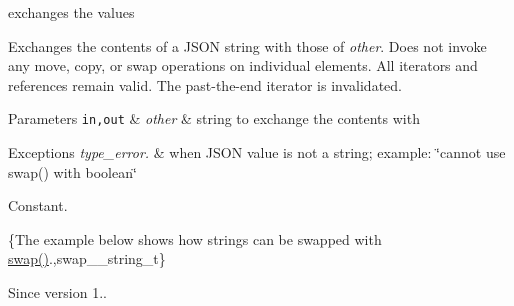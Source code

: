 exchanges the values 

Exchanges the contents of a J\+S\+ON string with those of {\itshape other}. Does not invoke any move, copy, or swap operations on individual elements. All iterators and references remain valid. The past-\/the-\/end iterator is invalidated.


\begin{DoxyParams}[1]{Parameters}
\mbox{\tt in,out}  & {\em other} & string to exchange the contents with\\
\hline
\end{DoxyParams}

\begin{DoxyExceptions}{Exceptions}
{\em type\+\_\+error.} & when J\+S\+ON value is not a string; example\+: {\ttfamily \char`\"{}cannot
use swap() with boolean\char`\"{}}\\
\hline
\end{DoxyExceptions}
Constant.

\{The example below shows how strings can be swapped with {\ttfamily \mbox{\hyperlink{classnlohmann_1_1basic__json_a8c9d932353e1ab98a7dc2fc27e002031}{swap()}}}.,swap\+\_\+\+\_\+string\+\_\+t\}

\begin{DoxySince}{Since}
version 1.. 
\end{DoxySince}
\mbox{\label{classnlohmann_1_1basic__json_a2566783e190dec524bf3445b322873b8}} 
